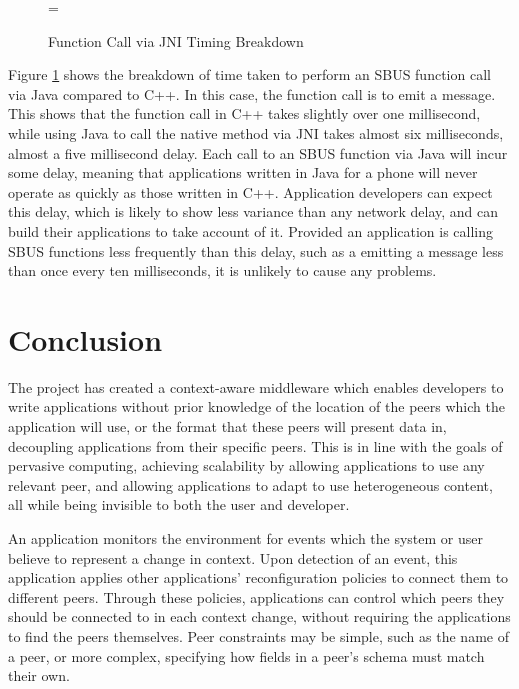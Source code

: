 \documentclass[12pt,twoside,notitlepage]{report}
\begin{document}
\begin{figure}[t]
\epsfxsize=\hsize
\centerline{}
\caption{Function Call via JNI Timing Breakdown}
\label{fig:jni_times}
\end{figure}

Figure \ref{fig:jni_times} shows the breakdown of time taken to perform an SBUS function call via Java compared to C++. 
In this case, the function call is to emit a message. 
This shows that the function call in C++ takes slightly over one millisecond, while using Java to call the native method via JNI takes almost six milliseconds, almost a five millisecond delay. 
Each call to an SBUS function via Java will incur some delay, meaning that applications written in Java for a phone will never operate as quickly as those written in C++.
Application developers can expect this delay, which is likely to show less variance than any network delay, and can build their applications to take account of it. 
Provided an application is calling SBUS functions less frequently than this delay, such as a emitting a message less than once every ten milliseconds, it is unlikely to cause any problems.





\cleardoublepage

\chapter{Conclusion}

The project has created a context-aware middleware which enables developers to write applications without prior knowledge of the location of the peers which the application will use, or the format that these peers will present data in, decoupling applications from their specific peers. 
This is in line with the goals of pervasive computing, achieving scalability by allowing applications to use any relevant peer, and allowing applications to adapt to use heterogeneous content, all while being invisible to both the user and developer.

An application monitors the environment for events which the system or user believe to represent a change in context.
Upon detection of an event, this application applies other applications' reconfiguration policies to connect them to different peers. 
Through these policies, applications can control which peers they should be connected to in each context change, without requiring the applications to find the peers themselves.
Peer constraints may be simple, such as the name of a peer, or more complex, specifying how fields in a peer's schema must match their own. 
\end{document}
